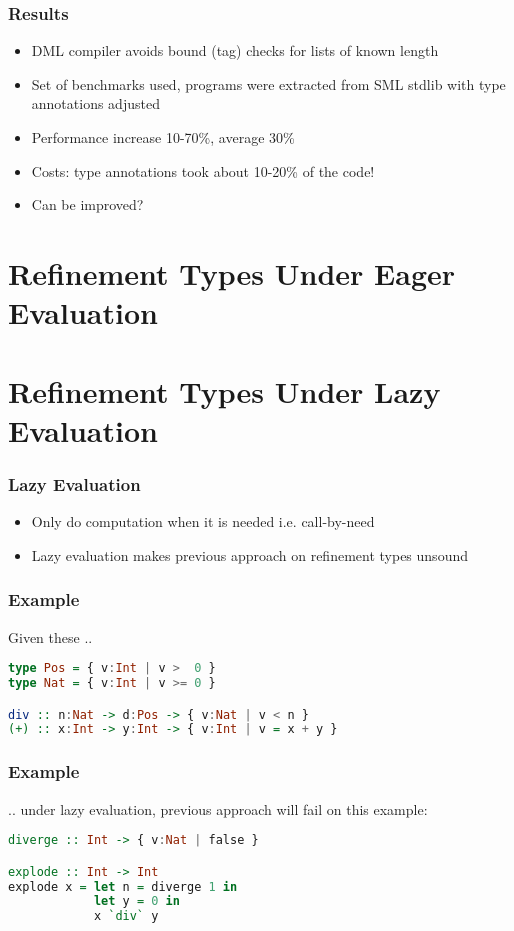 \documentclass[pdf]{beamer}
\begin{document}
\begin{frame}
  \frametitle{Results}

  \begin{itemize}
    \item DML compiler avoids bound (tag) checks for lists of known length
    \item Set of benchmarks used, programs were extracted from SML stdlib with
      type annotations adjusted
    \item Performance increase 10-70\%, average 30\%
    \item Costs: type annotations took about 10-20\% of the code!
    \item Can be improved?
  \end{itemize}
\end{frame}

\section{Refinement Types Under Eager Evaluation}

\section{Refinement Types Under Lazy Evaluation}

\begin{frame}
  \frametitle{Lazy Evaluation}
  \begin{itemize}
    \item Only do computation when it is needed i.e. call-by-need
    \item Lazy evaluation makes previous approach on refinement types unsound
  \end{itemize}
\end{frame}

\begin{frame}[fragile]
  \frametitle{Example}
  Given these ..
  \begin{lstlisting}[language=haskell]
type Pos = { v:Int | v >  0 }
type Nat = { v:Int | v >= 0 }

div :: n:Nat -> d:Pos -> { v:Nat | v < n } 
(+) :: x:Int -> y:Int -> { v:Int | v = x + y }
  \end{lstlisting}
\end{frame}

\begin{frame}[fragile]
  \frametitle{Example}
  .. under lazy evaluation, previous approach will fail on this example:
  \begin{lstlisting}[language=haskell]
diverge :: Int -> { v:Nat | false } 

explode :: Int -> Int
explode x = let n = diverge 1 in 
            let y = 0 in 
            x `div` y
  \end{lstlisting}
\end{frame}
\end{document}
